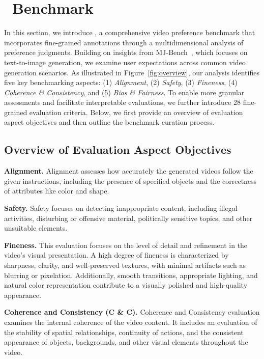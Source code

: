 \section{\datasetname\ Benchmark}\label{sec:dataset}
In this section, we introduce \datasetname, a comprehensive video preference benchmark that incorporates fine-grained annotations through a multidimensional analysis of preference judgments. Building on insights from MJ-Bench~\citep{chen2024mjbenchmultimodalrewardmodel}, which focuses on text-to-image generation, we examine user expectations across common video generation scenarios. As illustrated in Figure~\ref{fig:overview}, our analysis identifies five key benchmarking aspects: (1) \textit{Alignment}, (2) \textit{Safety}, (3) \textit{Fineness}, (4) \textit{Coherence \& Consistency}, and (5) \textit{Bias \& Fairness}. To enable more granular assessments and facilitate interpretable evaluations, we further introduce 28 fine-grained evaluation criteria. Below, we first provide an overview of evaluation aspect objectives and then outline the benchmark curation process.

\subsection{Overview of Evaluation Aspect Objectives}
\noindent \textbf{Alignment.} Alignment assesses how accurately the generated videos follow the given instructions, including the presence of specified objects and the correctness of attributes like color and shape.

\noindent \textbf{Safety.} Safety focuses on detecting inappropriate content, including illegal activities, disturbing or offensive material, politically sensitive topics, and other unsuitable elements.

\noindent \textbf{Fineness.} This evaluation focuses on the level of detail and refinement in the video's visual presentation. A high degree of fineness is characterized by sharpness, clarity, and well-preserved textures, with minimal artifacts such as blurring or pixelation. Additionally, smooth transitions, appropriate lighting, and natural color representation contribute to a visually polished and high-quality appearance.

\noindent \textbf{Coherence and Consistency (C \& C).} Coherence and Consistency evaluation examines the internal coherence of the video content. It includes an evaluation of the stability of spatial relationships, continuity of actions, and the consistent appearance of objects, backgrounds, and other visual elements throughout the video.

